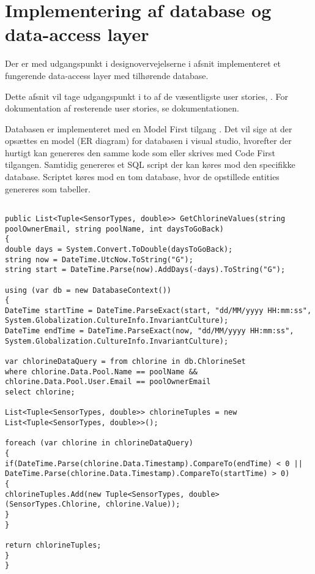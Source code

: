 \section{Implementering af database og data-access layer}


Der er med udgangspunkt i designovervejelserne i afsnit  implementeret et fungerende data-access layer med tilhørende database.

Dette afsnit vil tage udgangspunkt i to af de væsentligste user stories, . For dokumentation af resterende user stories, se dokumentationen.

Databasen er implementeret med en Model First tilgang . Det vil sige at der opsættes en model (ER diagram) for databasen i visual studio, hvorefter der hurtigt kan genereres den samme kode som eller skrives med Code First  tilgangen. Samtidig genereres et SQL script der kan køres mod den specifikke database. Scriptet køres mod en tom database, hvor de opstillede entities genereres som tabeller.





\begin{lstlisting}[caption= GetChlorineData method, label=code:getChlorineData]

public List<Tuple<SensorTypes, double>> GetChlorineValues(string poolOwnerEmail, string poolName, int daysToGoBack)
{
double days = System.Convert.ToDouble(daysToGoBack);
string now = DateTime.UtcNow.ToString("G");
string start = DateTime.Parse(now).AddDays(-days).ToString("G");

using (var db = new DatabaseContext())
{   
DateTime startTime = DateTime.ParseExact(start, "dd/MM/yyyy HH:mm:ss", System.Globalization.CultureInfo.InvariantCulture);
DateTime endTime = DateTime.ParseExact(now, "dd/MM/yyyy HH:mm:ss", System.Globalization.CultureInfo.InvariantCulture);

var chlorineDataQuery = from chlorine in db.ChlorineSet
where chlorine.Data.Pool.Name == poolName && chlorine.Data.Pool.User.Email == poolOwnerEmail
select chlorine;

List<Tuple<SensorTypes, double>> chlorineTuples = new List<Tuple<SensorTypes, double>>();

foreach (var chlorine in chlorineDataQuery)
{
if(DateTime.Parse(chlorine.Data.Timestamp).CompareTo(endTime) < 0 ||
DateTime.Parse(chlorine.Data.Timestamp).CompareTo(startTime) > 0)
{
chlorineTuples.Add(new Tuple<SensorTypes, double>(SensorTypes.Chlorine, chlorine.Value));
}
}

return chlorineTuples;
}
}
\end{lstlisting}